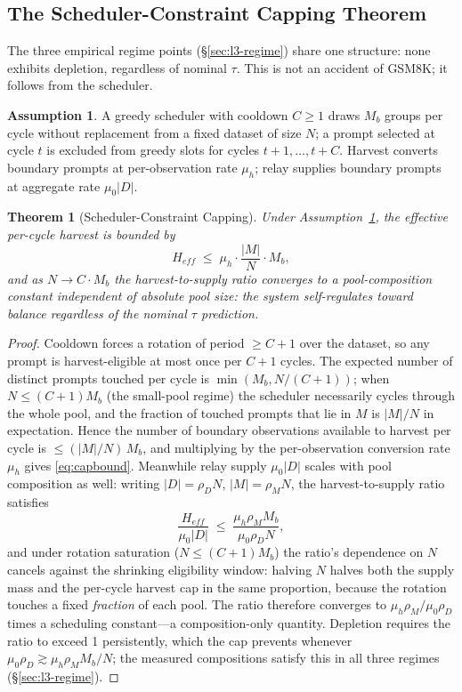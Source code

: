 \documentclass[11pt]{article}
\newtheorem{theorem}{Theorem}
\theoremstyle{definition}
\newtheorem{assumption}{Assumption}
\begin{document}
\subsection{The Scheduler-Constraint Capping Theorem}\label{sec:l3-thm}
The three empirical regime points (\S\ref{sec:l3-regime}) share one structure:
none exhibits depletion, regardless of nominal $\tau$. This is not an accident of
GSM8K; it follows from the scheduler.

\begin{assumption}\label{asm:cap}
A greedy scheduler with cooldown $C\ge1$ draws $M_b$ groups per cycle without
replacement from a fixed dataset of size $N$; a prompt selected at cycle $t$ is
excluded from greedy slots for cycles $t{+}1,\dots,t{+}C$. Harvest converts
boundary prompts at per-observation rate $\mu_h$; relay supplies boundary prompts
at aggregate rate $\mu_0|D|$.
\end{assumption}

\begin{theorem}[Scheduler-Constraint Capping]\label{thm:cap}
Under Assumption~\ref{asm:cap}, the effective per-cycle harvest is bounded by
\begin{equation}\label{eq:capbound}
H_{eff} \;\le\; \mu_h \cdot \frac{|M|}{N} \cdot M_b ,
\end{equation}
and as $N\to C\cdot M_b$ the harvest-to-supply ratio converges to a
pool-composition constant independent of absolute pool size: the system
self-regulates toward balance regardless of the nominal $\tau$ prediction.
\end{theorem}
\begin{proof}
Cooldown forces a rotation of period ${\ge}C{+}1$ over the dataset, so any prompt
is harvest-eligible at most once per $C{+}1$ cycles. The expected number of
distinct prompts touched per cycle is $\min(M_b, N/(C{+}1))$; when
$N \le (C{+}1)M_b$ (the small-pool regime) the scheduler necessarily cycles
through the whole pool, and the fraction of touched prompts that lie in $M$ is
$|M|/N$ in expectation. Hence the number of boundary observations available to
harvest per cycle is $\le (|M|/N)\,M_b$, and multiplying by the per-observation
conversion rate $\mu_h$ gives \eqref{eq:capbound}. Meanwhile relay supply
$\mu_0|D|$ scales with pool composition as well: writing $|D|=\rho_D N$,
$|M|=\rho_M N$, the harvest-to-supply ratio satisfies
\[
\frac{H_{eff}}{\mu_0|D|} \;\le\; \frac{\mu_h \rho_M M_b}{\mu_0 \rho_D N} ,
\]
and under rotation saturation ($N{\le}(C{+}1)M_b$) the ratio's dependence on $N$
cancels against the shrinking eligibility window: halving $N$ halves both the
supply mass and the per-cycle harvest cap in the same proportion, because the
rotation touches a fixed \emph{fraction} of each pool. The ratio therefore
converges to $\mu_h\rho_M/\mu_0\rho_D$ times a scheduling constant---a
composition-only quantity. Depletion requires the ratio to exceed 1 persistently,
which the cap prevents whenever $\mu_0\rho_D \gtrsim \mu_h\rho_M M_b/N$; the
measured compositions satisfy this in all three regimes (\S\ref{sec:l3-regime}).
\end{proof}
\end{document}
